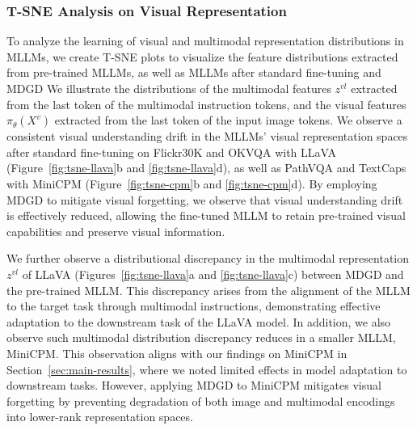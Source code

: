 \subsubsection{T-SNE Analysis on Visual Representation}
To analyze the learning of visual and multimodal representation distributions in MLLMs, 
we create T-SNE \cite{van2008visualizing} plots to visualize the feature distributions extracted from pre-trained MLLMs, 
as well as MLLMs after standard fine-tuning and MDGD
We illustrate the distributions of the multimodal features $z^{vl}$ extracted from the last token of the multimodal instruction tokens, 
and the visual features $\pi_\theta(X^v)$ extracted from the last token of the input image tokens.
We observe a consistent visual understanding drift in the MLLMs' visual representation spaces after standard fine-tuning on Flickr30K and OKVQA with LLaVA (Figure~\ref{fig:tsne-llava}b and \ref{fig:tsne-llava}d), as well as PathVQA and TextCaps with MiniCPM (Figure~\ref{fig:tsne-cpm}b and \ref{fig:tsne-cpm}d).
By employing MDGD to mitigate visual forgetting, we observe that visual understanding drift is effectively reduced, 
allowing the fine-tuned MLLM to retain pre-trained visual capabilities and preserve visual information.

We further observe a distributional discrepancy in the multimodal 
representation $z^{vl}$ of LLaVA (Figures~\ref{fig:tsne-llava}a and \ref{fig:tsne-llava}c) 
between MDGD and the pre-trained MLLM. 
This discrepancy arises from the alignment of the MLLM to the target task through multimodal instructions, 
demonstrating effective adaptation to the downstream task of the LLaVA model.
In addition, we also observe such multimodal distribution discrepancy reduces in a smaller MLLM, MiniCPM.
This observation aligns with our findings on MiniCPM in Section~\ref{sec:main-results}, 
where we noted limited effects in model adaptation to downstream tasks. 
However, applying MDGD to MiniCPM mitigates visual forgetting by preventing degradation of both image and multimodal encodings into lower-rank representation spaces.


